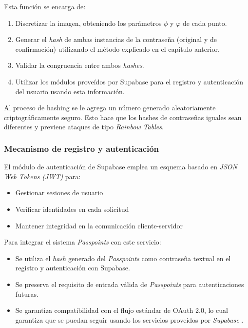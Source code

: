 Esta función se encarga de: 
\begin{enumerate}
	\item Discretizar la imagen, obteniendo los parámetros $\phi$  y $\varphi$ de cada punto.
	\item Generar el \textit{hash} de ambas instancias de la contraseña (original y de confirmación) utilizando el m\'etodo explicado en el cap\'itulo anterior.
	\item Validar la congruencia entre ambos \textit{hashes}.
	\item Utilizar los m\'odulos prove\'idos por Supabase para el registro y autenticaci\'on del usuario usando esta informaci\'on.
\end{enumerate}

Al proceso de hashing se le agrega un n\'umero generado aleatoriamente criptogr\'aficamente seguro. Esto hace que los hashes de contrase\~nas iguales sean diferentes y previene ataques de tipo \textit{Rainbow Tables}.

\subsubsection{Mecanismo de registro y autenticaci\'on}
El módulo de autenticación de Supabase emplea un esquema basado en \textit{JSON Web Tokens (JWT)} para:
\begin{itemize}
	\item Gestionar sesiones de usuario
	\item Verificar identidades en cada solicitud
	\item Mantener integridad en la comunicación cliente-servidor
\end{itemize}

Para integrar el sistema \textit{Passpoints} con este servicio:
\begin{itemize}
	\item Se utiliza el \textit{hash} generado del \textit{Passpoints} como contraseña textual en el registro y autenticaci\'on con Supabase.
	\item Se preserva el requisito de entrada válida de \textit{Passpoints} para autenticaciones futuras.
	\item Se garantiza compatibilidad con el flujo estándar de OAuth 2.0, lo cual garantiza que se puedan seguir usando los servicios prove\'idos por \textit{Supabase} \cite{supabase}.
\end{itemize}


